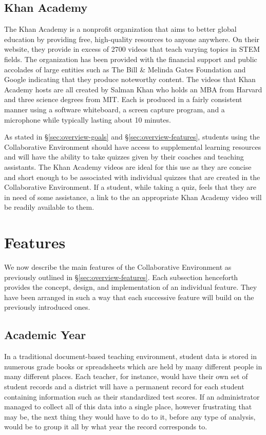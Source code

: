 \subsection{Khan Academy}
The Khan Academy is a nonprofit organization that aims to better global education by providing free, high-quality resources to anyone anywhere. \cite{khan-website-about} On their website, they provide in excess of 2700 videos that teach varying topics in STEM fields. The organization has been provided with the financial support and public accolades of large entities such as The Bill \& Melinda Gates Foundation and Google \cite{tech-award, google-10-100} indicating that they produce noteworthy content. The videos that Khan Academy hosts are all created by Salman Khan who holds an MBA from Harvard and three science degrees from MIT. Each is produced in a fairly consistent manner using a software whiteboard, a screen capture program, and a microphone while typically lasting about 10 minutes.

As stated in \S \ref{sec:overview-goals} and \S \ref{sec:overview-features}, students using the Collaborative Environment should have access to supplemental learning resources and will have the ability to take quizzes given by their coaches and teaching assistants. The Khan Academy videos are ideal for this use as they are concise and short enough to be associated with individual quizzes that are created in the Collaborative Environment. If a student, while taking a quiz, feels that they are in need of some assistance, a link to the an appropriate Khan Academy video will be readily available to them.

\section{Features}
\label{sec:design-features}
We now describe the main features of the Collaborative Environment as previously outlined in \S \ref{sec:overview-features}. Each subsection henceforth provides the concept, design, and implementation of an individual feature. They have been arranged in such a way that each successive feature will build on the previously introduced ones.

\subsection{Academic Year}
\label{subsec:design-year}
In a traditional document-based teaching environment, student data is stored in numerous grade books  or spreadsheets which are held by many different people in many different places. Each teacher, for instance, would have their own set of student records and a district will have a permanent record for each student containing information such as their standardized test scores. If an administrator managed to collect all of this data into a single place, however frustrating that may be, the next thing they would have to do to it, before any type of analysis, would be to group it all by what year the record corresponds to.

